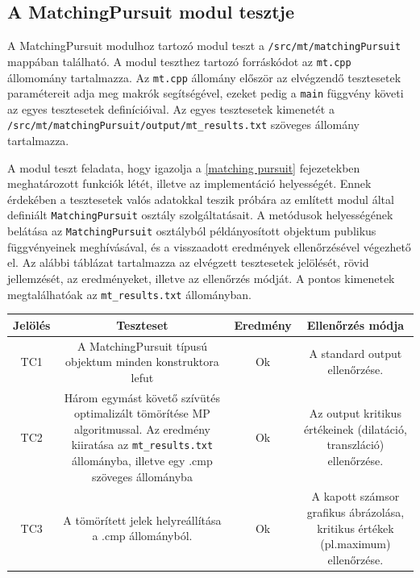 \documentclass[oneside,titlepage,12pt,a4paper]{report}
\begin{document}
\subsection{A MatchingPursuit modul tesztje}

A MatchingPursuit modulhoz tartozó modul teszt a \texttt{/src/mt/matchingPursuit} mappában található. A modul teszthez tartozó forráskódot az \texttt{mt.cpp} állomomány tartalmazza. Az \texttt{mt.cpp} állomány először az elvégzendő tesztesetek paramétereit adja meg makrók segítségével, ezeket pedig a \texttt{main} függvény követi az egyes tesztesetek definícióival. Az egyes tesztesetek kimenetét a \texttt{/src/mt/matchingPursuit/output/mt\_results.txt} szöveges állomány tartalmazza. 
\par A modul teszt feladata, hogy igazolja a \ref{matching pursuit} fejezetekben meghatározott funkciók létét, illetve az implementáció helyességét. Ennek érdekében a tesztesetek valós adatokkal teszik próbára az említett modul által definiált \texttt{MatchingPursuit} osztály szolgáltatásait. A metódusok helyességének belátása az \texttt{MatchingPursuit} osztályból példányosított objektum publikus függvényeinek meghívásával, és a visszaadott eredmények ellenőrzésével végezhető el. Az alábbi táblázat tartalmazza az elvégzett tesztesetek jelölését, rövid jellemzését, az eredményeket, illetve az ellenőrzés módját. A pontos kimenetek megtalálhatóak az \texttt{mt\_results.txt} állományban.

\begin{center}
\begin{adjustbox}{width=1\textwidth}
 \begin{tabular}{||c c c c||} 
 \hline
 Jelölés & Teszteset & Eredmény &  Ellenőrzés módja \\ [0.5ex] 
 \hline\hline
 TC1 & A MatchingPursuit típusú objektum minden konstruktora lefut &  Ok & A standard output ellenőrzése. \\ 
 \hline
 TC2 & Három egymást követő szívütés optimalizált tömörítése MP algoritmussal. Az eredmény kiiratása az \texttt{mt\_results.txt} állományba, illetve egy .cmp szöveges állományba &  Ok & Az output kritikus értékeinek (dilatáció, transzláció) ellenőrzése. \\
 \hline
 TC3 & A tömörített jelek helyreállítása a .cmp állományból. & Ok & A kapott számsor grafikus ábrázolása, kritikus értékek (pl.maximum) ellenőrzése. \\
 \hline
\end{tabular}
\end{adjustbox}
\end{center}
\end{document}
